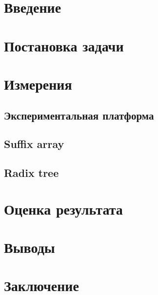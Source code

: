 \newpage
\tableofcontents
\newpage

\section{Введение}


\section{Постановка задачи}


\section{Измерения}


\subsection{Экспериментальная платформа}


\subsection{Suffix array}


\subsection{Radix tree}


\section{Оценка результата}


\section{Выводы}


\section{Заключение}
